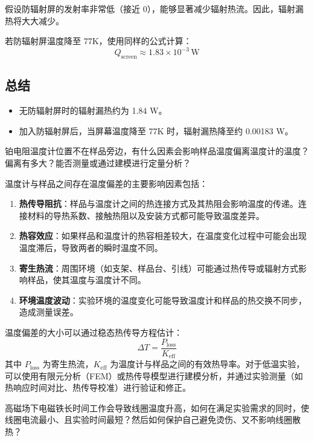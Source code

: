 假设防辐射屏的发射率非常低（接近 0），能够显著减少辐射热流。因此，辐射漏热将大大减少。

若防辐射屏温度降至 77K，使用同样的公式计算：
\[
Q_{\text{screen}} \approx 1.83 \times 10^{-3}\,\text{W}
\]

\subsection*{总结}

\begin{itemize}
    \item 无防辐射屏时的辐射漏热约为 1.84 W。
    \item 加入防辐射屏后，当屏幕温度降至 77K 时，辐射漏热降至约 0.00183 W。
\end{itemize}

\begin{question}
    铂电阻温度计位置不在样品旁边，有什么因素会影响样品温度偏离温度计的温度？偏离有多大？能否测量或通过建模进行定量分析？
\end{question}
温度计与样品之间存在温度偏差的主要影响因素包括：
\begin{enumerate}
    \item \textbf{热传导阻抗}：样品与温度计之间的热连接方式及其热阻会影响温度的传递。连接材料的导热系数、接触热阻以及安装方式都可能导致温度差异。
    \item \textbf{热容效应}：如果样品和温度计的热容相差较大，在温度变化过程中可能会出现温度滞后，导致两者的瞬时温度不同。
    \item \textbf{寄生热流}：周围环境（如支架、样品台、引线）可能通过热传导或辐射方式影响样品，使其温度与温度计不同。
    \item \textbf{环境温度波动}：实验环境的温度变化可能导致温度计和样品的热交换不同步，造成测量误差。
\end{enumerate}

温度偏差的大小可以通过稳态热传导方程估计：
\begin{equation}
    \Delta T = \frac{P_{\text{loss}}}{K_{\text{eff}}}
\end{equation}
其中 $P_{\text{loss}}$ 为寄生热流，$K_{\text{eff}}$ 为温度计与样品之间的有效热导率。对于低温实验，可以使用有限元分析（FEM）或热传导模型进行建模分析，并通过实验测量（如热响应时间对比、热传导校准）进行验证和修正。

\begin{question}
    高磁场下电磁铁长时间工作会导致线圈温度升高，如何在满足实验需求的同时，使线圈电流最小、且实验时间最短？然后如何保护自己避免烫伤、又不影响线圈散热？
\end{question}

